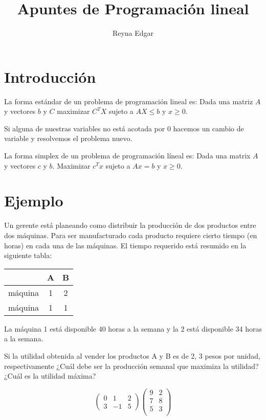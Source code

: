 \documentclass{article}
\title{Apuntes de Programación lineal}
\author{Reyna Edgar}
\begin{document}
\maketitle
\tableofcontents
\section{Introducción}
\label{sec:inicio}

La forma estándar de un problema de programación lineal es:
Dada una matriz $A$ y vectores $b$ y $C$ maximizar $C^TX$ sujeto a
$AX\leq b$ y $x\geq0$.

\smallskip
Si alguna de nuestras variables no está acotada por 0 hacemos un cambio de variable y resolvemos el problema nuevo.

La forma simplex de un problema de programación líneal es:
Dada una matrix $A$ y vectores $c$ y $b$. Maximizar $c^Tx$ sujeto a
$Ax=b$ y $x\geq0$.

\section{Ejemplo}
\label{sec:ejemplo-1}

Un gerente está planeando como distribuir la producción de dos productos entre dos máquinas. Para ser manufacturado cada producto requiere cierto tiempo (en horas) en cada una de las máquinas.
El tiempo requerido está resumido en la siguiente tabla:
\begin{center}
  \begin{tabular}
  {|c|c|c|}
  \hline
  &A&B\\
  \hline
  máquina&1&2\\
  \hline
  máquina&1 &1\\
  \hline
\end{tabular}
\end{center}

La máquina 1 está disponible 40 horas a la semana y la 2 está disponible 34 horas a la semana.

Si la utilidad obtenida al vender los productos A y B es de 2, 3 pesos por unidad, respectivamente ¿Cuál debe ser la producción semanal que maximiza la utilidad? ¿Cuál es la utilidad máxima?

\begin{equation*}
  \label{eq:1}
  \begin{pmatrix}
    0&1&2\\
    3&-1&5
  \end{pmatrix}
  \begin{pmatrix}
    9&2\\
    7&8\\
    5&3\\
  \end{pmatrix}
\end{equation*}
\end{document}
